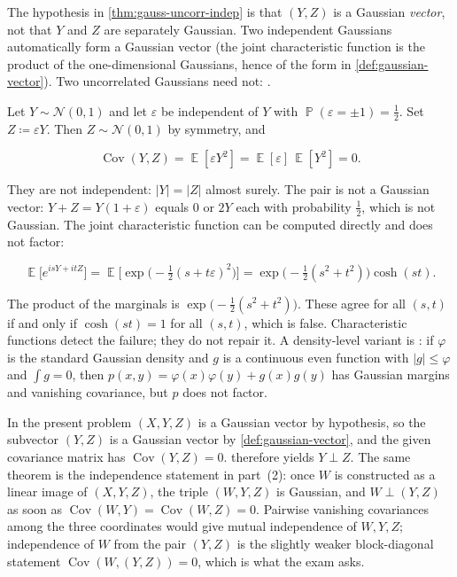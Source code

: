 \documentclass[11pt,a4paper]{article}
\DeclareMathOperator{\E}{\mathbb{E}}
\DeclareMathOperator{\Pbb}{\mathbb{P}}
\begin{document}
\begin{warning}
\label{warn:marginal-gauss-not-joint}
The hypothesis in \cref{thm:gauss-uncorr-indep} is that \( (Y,Z) \) is a Gaussian \emph{vector}, not that \( Y \) and \( Z \) are separately Gaussian. Two independent Gaussians automatically form a Gaussian vector (the joint characteristic function is the product of the one-dimensional Gaussians, hence of the form in \cref{def:gaussian-vector}). Two uncorrelated Gaussians need not: \citep[after Theorem~6.2.1]{ren2024}.
\end{warning}

\begin{example}
\label{ex:signflip}
Let \( Y\sim\mathcal{N}(0,1) \) and let \( \varepsilon \) be independent of \( Y \) with \( \Pbb(\varepsilon=\pm 1)=\tfrac12 \). Set \( Z\coloneqq\varepsilon Y \). Then \( Z\sim\mathcal{N}(0,1) \) by symmetry, and

\[
\operatorname{Cov}(Y,Z)
=
\E[\varepsilon Y^{2}]
=
\E[\varepsilon]\,\E[Y^{2}]
=
0.
\]

They are not independent: \( |Y|=|Z| \) almost surely. The pair is not a Gaussian vector: \( Y+Z=Y(1+\varepsilon) \) equals \( 0 \) or \( 2Y \) each with probability \( \tfrac12 \), which is not Gaussian. The joint characteristic function can be computed directly and does not factor:

\[
\E\bigl[e^{isY+itZ}\bigr]
=
\E\bigl[\exp\bigl(-\tfrac12(s+t\varepsilon)^{2}\bigr)\bigr]
=
\exp\bigl(-\tfrac12(s^{2}+t^{2})\bigr)\cosh(st).
\]

The product of the marginals is \( \exp\bigl(-\tfrac12(s^{2}+t^{2})\bigr) \). These agree for all \( (s,t) \) if and only if \( \cosh(st)=1 \) for all \( (s,t) \), which is false. Characteristic functions detect the failure; they do not repair it. A density-level variant is \citep[Example~3, \S6.2]{ren2024}: if \( \varphi \) is the standard Gaussian density and \( g \) is a continuous even function with \( |g|\le\varphi \) and \( \int g=0 \), then \( p(x,y)=\varphi(x)\varphi(y)+g(x)g(y) \) has Gaussian margins and vanishing covariance, but \( p \) does not factor.
\end{example}

In the present problem \( (X,Y,Z) \) is a Gaussian vector by hypothesis, so the subvector \( (Y,Z) \) is a Gaussian vector by \cref{def:gaussian-vector}, and the given covariance matrix has \( \operatorname{Cov}(Y,Z)=0 \).  therefore yields \( Y\perp Z \). The same theorem is the independence statement in part~(2): once \( W \) is constructed as a linear image of \( (X,Y,Z) \), the triple \( (W,Y,Z) \) is Gaussian, and \( W\perp(Y,Z) \) as soon as \( \operatorname{Cov}(W,Y)=\operatorname{Cov}(W,Z)=0 \). Pairwise vanishing covariances among the three coordinates would give mutual independence of \( W,Y,Z \); independence of \( W \) from the pair \( (Y,Z) \) is the slightly weaker block-diagonal statement \( \operatorname{Cov}(W,(Y,Z))=0 \), which is what the exam asks.
\end{document}
